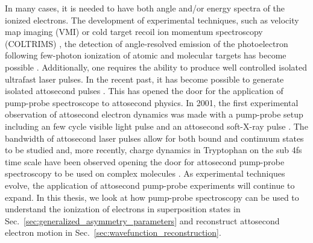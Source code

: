 In many cases, it is needed to have both angle and/or energy spectra of the ionized electrons. The development of experimental techniques, such as velocity map imaging (VMI) \cite{kornilov2010,rouzee2011} or cold target recoil ion momentum spectroscopy (COLTRIMS) \cite{ullrich2003}, the detection of angle-resolved emission of the photoelectron following few-photon ionization of atomic and molecular targets has become possible \cite{ma2013}. 
Additionally, one requires the ability to produce well controlled isolated ultrafast laser pulses. In the recent past, it has become possible to generate isolated attosecond pulses \cite{frank2010}. This has opened the door for the application of pump-probe spectroscope to attosecond physics. In 2001, the first experimental observation of attosecond electron dynamics was made with a pump-probe setup including an few cycle visible light pulse and an attosecond soft-X-ray pulse \cite{hentschel2001}. The bandwidth of attosecond laser pulses allow for both bound and continuum states to be studied \cite{mauritsson2010} and, more recently, charge dynamics in Tryptophan on the sub 4fs time scale have been observed opening the door for attosecond pump-probe spectroscopy to be used on complex molecules \cite{larasstiaso2018}. As experimental techniques evolve, the application of attosecond pump-probe experiments will continue to expand. In this thesis, we look at how pump-probe spectroscopy can be used to understand the ionization of electrons in superposition states in Sec.~\ref{sec:generalized_asymmetry_parameters} and reconstruct attosecond electron motion in Sec.~\ref{sec:wavefunction_reconstruction}.


